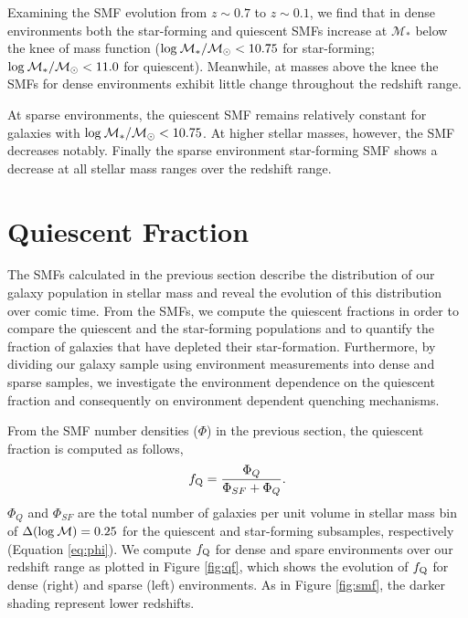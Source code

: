 \documentclass{emulateapj}
\begin{document}
Examining the SMF evolution from $z \sim 0.7$ to $z \sim 0.1$, 
we find that in dense environments both the star-forming and quiescent
SMFs increase at $\mathcal{M}_{*}$ below the knee of mass function 
($\rm{log}\: \mathcal{M}_{*}/\mathcal{M}_{\odot} < 10.75$ for star-forming; 
$\rm{log}\: \mathcal{M}_{*}/\mathcal{M}_{\odot} < 11.0$ for quiescent). 
Meanwhile, at masses above the knee the SMFs for dense environments 
exhibit little change throughout the redshift range.

At sparse environments, the quiescent SMF remains relatively constant 
for galaxies with $\rm{log}\: \mathcal{M}_{*}/\mathcal{M}_{\odot} < 10.75$.
At higher stellar masses, however, the SMF decreases notably. Finally 
the sparse environment star-forming SMF shows a decrease at all 
stellar mass ranges over the redshift range. 


\section{Quiescent Fraction} \label{sec:qf_const}
The SMFs calculated in the previous section describe
the distribution of our galaxy population in stellar mass 
and reveal the evolution of this distribution
over comic time. From the SMFs, we 
compute the quiescent fractions in order to compare the 
quiescent and the star-forming populations 
and to quantify the fraction of galaxies that have
depleted their star-formation. Furthermore, by dividing our 
galaxy sample using environment measurements into dense
and sparse samples, we investigate the environment 
dependence on the quiescent fraction and consequently 
on environment dependent quenching mechanisms. 

From the SMF number densities ($\Phi$)
in the previous section, the quiescent fraction is computed 
as follows, 
\begin{equation}
f_{\rm{Q}} = \frac{\Phi_{Q}}{\Phi_{SF}+\Phi_{Q}}.
\end{equation}
$\Phi_{Q}$ and $\Phi_{SF}$ are the total number of galaxies 
per unit volume in stellar mass bin of $\Delta(\rm{log} \: \mathcal{M}) = 0.25$ 
for the quiescent and star-forming subsamples, respectively 
(Equation \ref{eq:phi}). We compute $f_{\rm{Q}}$ for dense 
and spare environments over our redshift range as plotted in
 Figure \ref{fig:qf}, which shows the evolution of $f_{\rm{Q}}$ 
 for dense (right) and sparse (left) environments. As in 
 Figure \ref{fig:smf}, the darker shading represent lower redshifts. 
\end{document}
